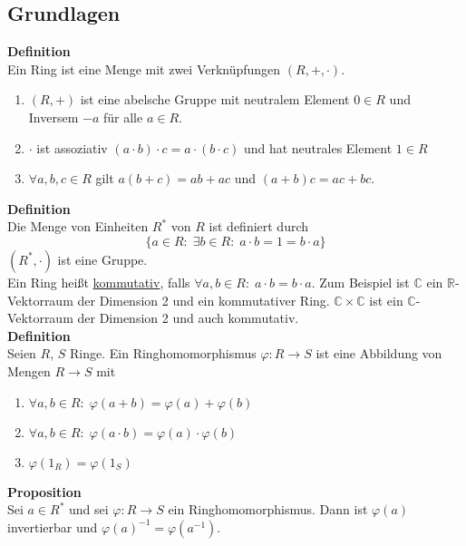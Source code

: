 \documentclass[a4paper, 12pt]{article}
\begin{document}
\subsection{Grundlagen}
\textbf{Definition}\\
Ein Ring ist eine Menge mit zwei Verknüpfungen $(R,+,\cdot)$. \begin{enumerate}
	\item $(R,+)$ ist eine abelsche Gruppe mit neutralem Element $0\in R$ und Inversem $-a$ für alle $a \in R$.
	\item $\cdot$ ist assoziativ $(a\cdot b) \cdot c = a \cdot (b\cdot c)$ und hat neutrales Element $1 \in R$
	\item $\forall a,b,c \in R$ gilt $a(b+c) = ab + ac$ und $(a+b)c = ac + bc$.
\end{enumerate}
\textbf{Definition}\\
Die Menge von Einheiten $R^*$ von $R$ ist definiert durch \[\{a \in R: \; \exists b \in R: \; a\cdot b = 1 = b\cdot a\}\]
$(R^*, \cdot)$ ist eine Gruppe.\\

Ein Ring heißt \underline{kommutativ}, falls $\forall a,b \in R: \; a\cdot b = b\cdot a$. Zum Beispiel ist $\mathbb{C}$ ein $\mathbb{R}$-Vektorraum der Dimension 2 und ein kommutativer Ring. $\mathbb{C} \times \mathbb{C}$ ist ein $\mathbb{C}$-Vektorraum der Dimension 2 und auch kommutativ.\\
\textbf{Definition}\\
Seien $R$, $S$ Ringe. Ein Ringhomomorphismus $\varphi: R \to S$ ist eine Abbildung von Mengen $R \to S$ mit \begin{enumerate}
	\item $\forall a,b \in R: \; \varphi(a+b) = \varphi(a)+\varphi(b)$
	\item $\forall a,b \in R: \; \varphi(a\cdot b) = \varphi(a) \cdot \varphi(b)$
	\item $\varphi(1_R) = \varphi(1_S)$ 
\end{enumerate}
\textbf{Proposition}\\
Sei $a \in R^*$ und sei $\varphi: R \to S$ ein Ringhomomorphismus. Dann ist $\varphi(a)$ invertierbar und $\varphi(a)^{-1} = \varphi(a^{-1})$.\\
\end{document}
